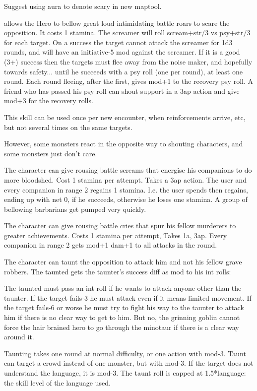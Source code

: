 Suggest using aura to denote scary in new maptool.


 allows the Hero to bellow great loud intimidating battle roars to scare the opposition. It costs 1 stamina. The screamer will roll scream+str/3 vs psy+str/3 for each target. On a success the target cannot attack the screamer for 1d3 rounds, and will have an initiative-5 mod against the screamer. If it is a good (3+) success then the targets must flee away from the noise maker, and hopefully towards safety... until he succeeds with a psy roll (one per round), at least one round. Each round fleeing, after the first, gives mod+1 to the recovery psy roll. A friend who has passed his psy roll can shout support in a 3ap action and give mod+3 for the recovery rolls.

This skill can be used once per new encounter, when reinforcements arrive, etc, but not several times on the same targets.

However, some monsters react in the opposite way to shouting characters, and some monsters just don't care.


 The character can give rousing battle screams that energise his companions to do more bloodshed.
Cost 1 stamina per attempt. Takes a 3ap action. The user and every companion in range 2 regains 1 stamina. I.e. the user spends then regains, ending up with net 0, if he succeeds, otherwise he loses one stamina.
A group of bellowing barbarians get pumped very quickly.


 The character can give rousing battle cries that spur his fellow murderers to greater achievements.
Costs 1 stamina per attempt, Takes 1a, 3ap. Every companion in range 2 gets mod+1 dam+1 to all attacks in the round.


 The character can taunt the opposition to attack him and not his fellow grave robbers. The taunted gets the taunter's success diff as mod to his int rolls:

The taunted must pass an int roll if he wants to attack anyone other than the taunter. If the target fails-3 he must attack even if it means limited movement. If the target fails-6 or worse he must try to fight his way to the taunter to attack him if there is no clear way to get to him. But no, the grinning goblin cannot force the hair brained hero to go through the minotaur if there is a clear way around it.

Taunting takes one round at normal difficulty, or one action with mod-3. Taunt can target a crowd instead of one monster, but with mod-3. If the target does not understand the language, it is mod-3. The taunt roll is capped at 1.5*language: the skill level of the language used.

